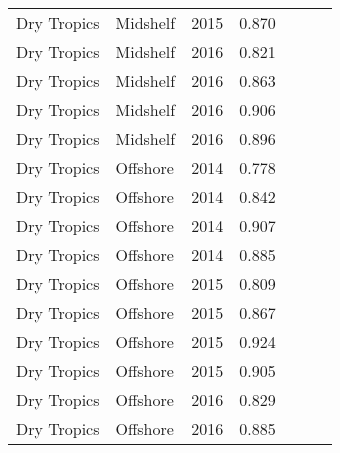 {\begin{longtable}{llccccc}
  Dry Tropics & Midshelf & 2015 & 0.870 & \cellcolor[HTML]{00734D}{A} & \cellcolor[HTML]{00734D}{A} & \cellcolor[HTML]{00734D}{A} \\ 
  Dry Tropics & Midshelf & 2016 & 0.821 & \cellcolor[HTML]{B0D235}{B} & \cellcolor[HTML]{00734D}{A} & \cellcolor[HTML]{B0D235}{B} \\ 
  Dry Tropics & Midshelf & 2016 & 0.863 & \cellcolor[HTML]{00734D}{A} & \cellcolor[HTML]{00734D}{A} & \cellcolor[HTML]{00734D}{A} \\ 
  Dry Tropics & Midshelf & 2016 & 0.906 & \cellcolor[HTML]{00734D}{A} & \cellcolor[HTML]{00734D}{A} & \cellcolor[HTML]{00734D}{A} \\ 
  Dry Tropics & Midshelf & 2016 & 0.896 & \cellcolor[HTML]{00734D}{A} & \cellcolor[HTML]{00734D}{A} & \cellcolor[HTML]{00734D}{A} \\ 
  Dry Tropics & Offshore & 2014 & 0.778 & \cellcolor[HTML]{B0D235}{B} & \cellcolor[HTML]{B0D235}{B} & \cellcolor[HTML]{B0D235}{B} \\ 
  Dry Tropics & Offshore & 2014 & 0.842 & \cellcolor[HTML]{00734D}{A} & \cellcolor[HTML]{00734D}{A} & \cellcolor[HTML]{B0D235}{B} \\ 
  Dry Tropics & Offshore & 2014 & 0.907 & \cellcolor[HTML]{00734D}{A} & \cellcolor[HTML]{00734D}{A} & \cellcolor[HTML]{00734D}{A} \\ 
  Dry Tropics & Offshore & 2014 & 0.885 & \cellcolor[HTML]{00734D}{A} & \cellcolor[HTML]{00734D}{A} & \cellcolor[HTML]{00734D}{A} \\ 
  Dry Tropics & Offshore & 2015 & 0.809 & \cellcolor[HTML]{B0D235}{B} & \cellcolor[HTML]{00734D}{A} & \cellcolor[HTML]{B0D235}{B} \\ 
  Dry Tropics & Offshore & 2015 & 0.867 & \cellcolor[HTML]{00734D}{A} & \cellcolor[HTML]{00734D}{A} & \cellcolor[HTML]{00734D}{A} \\ 
  Dry Tropics & Offshore & 2015 & 0.924 & \cellcolor[HTML]{00734D}{A} & \cellcolor[HTML]{00734D}{A} & \cellcolor[HTML]{00734D}{A} \\ 
  Dry Tropics & Offshore & 2015 & 0.905 & \cellcolor[HTML]{00734D}{A} & \cellcolor[HTML]{00734D}{A} & \cellcolor[HTML]{00734D}{A} \\ 
  Dry Tropics & Offshore & 2016 & 0.829 & \cellcolor[HTML]{B0D235}{B} & \cellcolor[HTML]{00734D}{A} & \cellcolor[HTML]{B0D235}{B} \\ 
  Dry Tropics & Offshore & 2016 & 0.885 & \cellcolor[HTML]{00734D}{A} & \cellcolor[HTML]{00734D}{A} & \cellcolor[HTML]{00734D}{A} \\ 

\end{longtable}}
